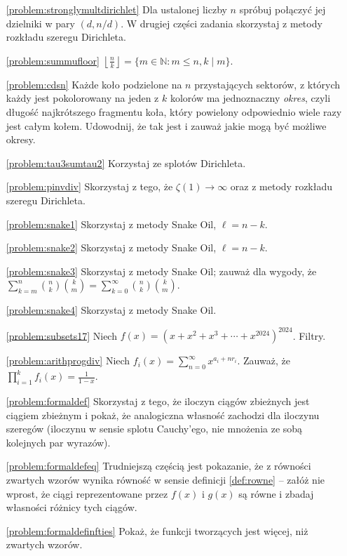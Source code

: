 \documentclass[shortabstract]{imthesis}
\begin{document}
\begin{enumerate}
\item[\ref{problem:stronglymultdirichlet}] Dla ustalonej liczby $n$ spróbuj połączyć jej dzielniki w pary $(d, n/d)$. W drugiej części zadania skorzystaj z metody rozkładu szeregu Dirichleta.

\item[\ref{problem:summufloor}] $\left\lfloor \frac{n}{k} \right\rfloor = \{m \in \mathbb{N} : m \leq n, k \mid m\}$.

\item[\ref{problem:cdsn}] Każde koło podzielone na $n$ przystających sektorów, z których każdy jest pokolorowany na jeden z $k$ kolorów ma jednoznaczny \emph{okres}, czyli długość najkrótszego fragmentu koła, który powielony odpowiednio wiele razy jest całym kołem. Udowodnij, że tak jest i zauważ jakie mogą być możliwe okresy.

\item[\ref{problem:tau3sumtau2}] Korzystaj ze splotów Dirichleta.

\item[\ref{problem:pinvdiv}] Skorzystaj z tego, że $\zeta(1) \to \infty$ oraz z metody rozkładu szeregu Dirichleta.

\item[\ref{problem:snake1}] Skorzystaj z metody Snake Oil, $\ell = n-k$.

\item[\ref{problem:snake2}] Skorzystaj z metody Snake Oil, $\ell = n-k$.

\item[\ref{problem:snake3}] Skorzystaj z metody Snake Oil; zauważ dla wygody, że $\sum_{k=m}^n {n \choose k}{k \choose m} = \sum_{k=0}^\infty {n \choose k}{k \choose m}$.

\item[\ref{problem:snake4}] Skorzystaj z metody Snake Oil.

\item[\ref{problem:subsets17}] Niech $f(x) = (x+x^2+x^3+\cdots+x^{2024})^{2024}$. Filtry.

\item[\ref{problem:arithprogdiv}] Niech $f_i(x) = \sum_{n=0}^\infty x^{a_i + nr_i}$. Zauważ, że $\prod_{i=1}^k f_i(x) = \frac{1}{1-x}$.

\item[\ref{problem:formaldef}] Skorzystaj z tego, że iloczyn ciągów zbieżnych jest ciągiem zbieżnym i pokaż, że analogiczna własność zachodzi dla iloczynu szeregów (iloczynu w sensie splotu Cauchy'ego, nie mnożenia ze sobą kolejnych par wyrazów).

\item[\ref{problem:formaldefeq}] Trudniejszą częścią jest pokazanie, że z równości zwartych wzorów wynika równość w sensie definicji \ref{def:rowne} -- załóż nie wprost, że ciągi reprezentowane przez $f(x)$ i $g(x)$ są równe i zbadaj własności różnicy tych ciągów.

\item[\ref{problem:formaldefinfties}] Pokaż, że funkcji tworzących jest więcej, niż zwartych wzorów.



\end{enumerate}



\end{document}
